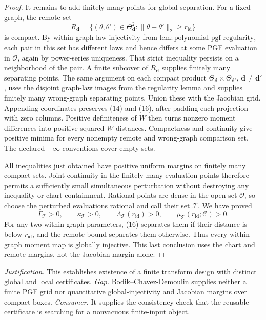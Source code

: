 \documentclass{article}
\begin{document}
\begin{proof}
It remains to add finitely many points for global separation.  For a fixed graph, the remote set
\[
 R_{\boldsymbol d}=\{(\theta,\theta')\in
 \Theta_{\boldsymbol d}^2:\|\theta-\theta'\|_2\geq r_{\mathrm{id}}\}
\]
is compact.  By within-graph law injectivity from \(\mathrm{lem{:}polynomial\text{-}pgf\text{-}regularity}\), each pair in this set has different laws and hence differs at some PGF evaluation in \(\mathcal O\), again by power-series uniqueness.  That strict inequality persists on a neighborhood of the pair.  A finite subcover of \(R_{\boldsymbol d}\) supplies finitely many separating points.  The same argument on each compact product \(\Theta_{\boldsymbol d}\times\Theta_{\boldsymbol d'}\), \(\boldsymbol d\ne\boldsymbol d'\), uses the disjoint graph-law images from the regularity lemma and supplies finitely many wrong-graph separating points.  Union these with the Jacobian grid.  Appending coordinates preserves (14) and (16), after padding each projection with zero columns.  Positive definiteness of \(W\) then turns nonzero moment differences into positive squared \(W\)-distances.  Compactness and continuity give positive minima for every nonempty remote and wrong-graph comparison set.  The declared \(+\infty\) conventions cover empty sets.

All inequalities just obtained have positive uniform margins on finitely many compact sets.  Joint continuity in the finitely many evaluation points therefore permits a sufficiently small simultaneous perturbation without destroying any inequality or chart containment.  Rational points are dense in the open set \(\mathcal O\), so choose the perturbed evaluations rational and call their set \(\mathcal T\).  We have proved
\[
 \Gamma_{\mathcal T}>0,
 \qquad \kappa_{\mathcal T}>0,
 \qquad \Lambda_{\mathcal T}(r_{\mathrm{id}})>0,
 \qquad \mu_{\mathcal T}(r_{\mathrm{id}};\mathscr C)>0. \tag{17}
\]
For any two within-graph parameters, (16) separates them if their distance is below \(r_{\mathrm{id}}\), and the remote bound separates them otherwise.  Thus every within-graph moment map is globally injective.  This last conclusion uses the chart and remote margins, not the Jacobian margin alone.
\end{proof}
\par\smallskip\noindent \textit{Justification.} This establishes existence of a finite transform design with distinct global and local certificates. \textit{Gap.} Bodik--Chavez-Demoulin supplies neither a finite PGF grid nor quantitative global-injectivity and Jacobian margins over compact boxes. \textit{Consumer.} It supplies the consistency check that the reusable certificate is searching for a nonvacuous finite-input object.
\end{document}
